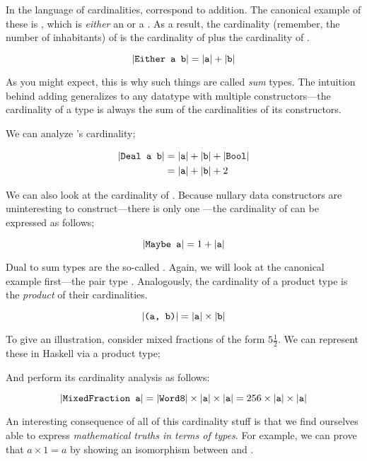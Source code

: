 \documentclass[book.tex]{subfiles}
\begin{document}
In the language of cardinalities,  correspond to
addition. The canonical example of these is , which is
\emph{either} an  or a . As a result, the cardinality (remember, the
number of inhabitants) of  is the cardinality of  plus the
cardinality of .

$$
\lvert\texttt{Either a b}\rvert = \lvert\texttt{a}\rvert + \lvert\texttt{b}\rvert
$$

As you might expect, this is why such things are called \emph{sum} types. The
intuition behind adding generalizes to any datatype with multiple
constructors---the cardinality of a type is always the sum of the cardinalities
of its constructors.


We can analyze 's cardinality;

$$
\begin{align*}
  \lvert\texttt{Deal a b}\rvert &= \lvert\texttt{a}\rvert + \lvert\texttt{b}\rvert + \lvert\texttt{Bool}\rvert \\
  &= \lvert\texttt{a}\rvert + \lvert\texttt{b}\rvert + 2
\end{align*}
$$

We can also look at the cardinality of . Because nullary data
constructors are uninteresting to construct---there is only one
---the cardinality of  can be expressed as follows;

$$
\lvert\texttt{Maybe a}\rvert = 1 + \lvert\texttt{a}\rvert
$$

Dual to sum types are the so-called . Again,
we will look at the canonical example first---the pair type .
Analogously, the cardinality of a product type is the \emph{product} of their
cardinalities.

$$
\lvert\texttt{(a, b)}\rvert = \lvert\texttt{a}\rvert \times \lvert\texttt{b}\rvert
$$

To give an illustration, consider mixed fractions of the form $5\frac{1}{2}$. We
can represent these in Haskell via a product type;


And perform its cardinality analysis as follows:

$$
\lvert\texttt{MixedFraction a}\rvert = \lvert\texttt{Word8}\rvert \times \lvert\texttt{a}\rvert \times \lvert\texttt{a}\rvert = 256
\times \lvert\texttt{a}\rvert \times \lvert\texttt{a}\rvert
$$

An interesting consequence of all of this cardinality stuff is that we find
ourselves able to express \emph{mathematical truths in terms of types}. For
example, we can prove that $a \times 1 = a$ by showing an isomorphism between
 and .
\end{document}
